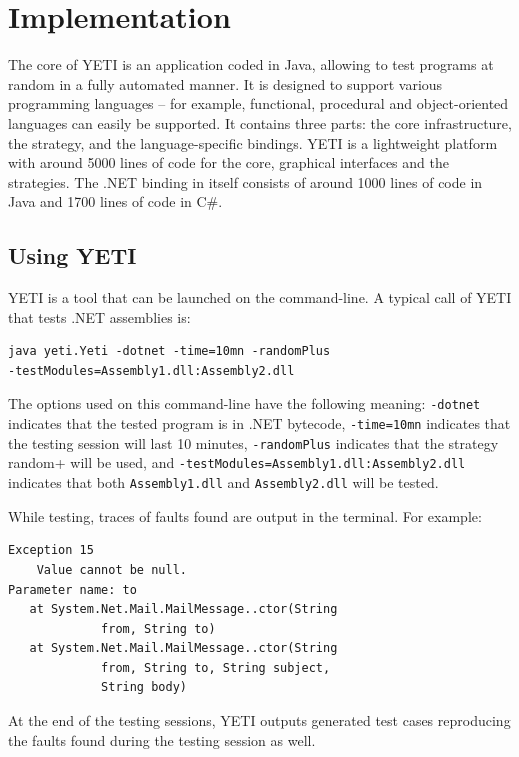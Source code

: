 \section{Implementation}\label{sec:implem}

The core of YETI is an application coded in Java, allowing to test programs at random in a fully automated manner. It is designed to support various programming languages -- for example, functional, procedural and object-oriented languages can easily be supported.
 It contains three parts: the core infrastructure, the strategy, and the language-specific bindings. 
YETI is a lightweight platform with around 5000 lines of code for the core, graphical interfaces and the strategies.
The .NET binding in itself consists of around 1000 lines of code in Java and 1700 lines of code in C\#.

\subsection{Using YETI}
YETI is a tool that can be launched on the command-line. A typical call of YETI that tests .NET assemblies is:
{\small
\begin{verbatim}
java yeti.Yeti -dotnet -time=10mn -randomPlus
-testModules=Assembly1.dll:Assembly2.dll
\end{verbatim}
}

The options used on this command-line have the following meaning: \texttt{-dotnet} 
indicates that the tested program is in .NET bytecode,
\texttt{-time=10mn} indicates that the testing session will last 10 minutes, 
\texttt{-randomPlus} indicates that the strategy random+ will be used, and  
\texttt{-testModules=Assembly1.dll:Assembly2.dll} indicates that both \texttt{Assembly1.dll} and
\texttt{Assembly2.dll} will be tested.

While testing, traces of faults found are output in the terminal. For example:

{\small
\begin{verbatim}
Exception 15
	Value cannot be null.
Parameter name: to
   at System.Net.Mail.MailMessage..ctor(String 
             from, String to)
   at System.Net.Mail.MailMessage..ctor(String 
             from, String to, String subject, 
             String body)
\end{verbatim}
}

At the end of the testing sessions, YETI outputs generated test cases reproducing 
the faults found during the testing session as well.


